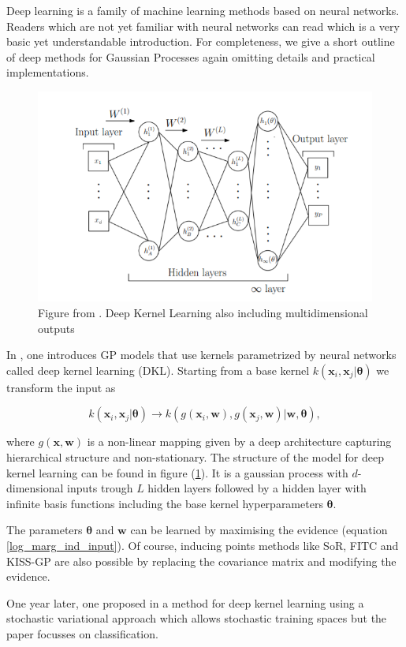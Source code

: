 \documentclass[12pt,a4paper,oneside]{book}
\begin{document}
Deep learning is a family of machine learning methods based on neural networks. Readers which are not yet familiar with neural networks can read \cite{nielsen2015neural} which is a very basic yet understandable introduction. For completeness, we give a short outline of deep methods for Gaussian Processes again omitting details and practical implementations. 


\begin{figure}[!htb]
     \centering
     \includegraphics[width=0.4\linewidth]{plot_deep_gpr}
     \caption{Figure from \cite{wilson2016deep}. Deep Kernel Learning also including multidimensional outputs}\label{fig:deep_gpr1.1}
\end{figure}

In \cite{wilson2016deep}, one introduces GP models that use kernels parametrized by neural networks called deep kernel learning (DKL). Starting from a base kernel $k(\bm{x}_i, \bm{x}_j | \bm{\theta})$ we transform the input as 

\begin{equation}
k(\bm{x}_i, \bm{x}_j | \bm{\theta}) \rightarrow k(g(\bm{x}_i, \bm{w}), g(\bm{x}_j, \bm{w})| \bm{w}, \bm{\theta}),
\end{equation}

where $g(\bm{x}, \bm{w})$ is a non-linear mapping given by a deep architecture capturing hierarchical structure and non-stationary. The structure of the model for deep kernel learning can be found in figure (\ref{fig:deep_gpr1.1}). It is a gaussian process with $d$-dimensional inputs trough $L$ hidden layers followed by a hidden layer with infinite basis functions including the base kernel hyperparameters $\bm{\theta}$. 


The parameters $\bm{\theta}$ and $\bm{w}$ can be learned by maximising the evidence (equation \ref{log_marg_ind_input}). Of course, inducing points methods like SoR, FITC and KISS-GP are also possible by replacing the covariance matrix and modifying the evidence. 

One year later, one proposed in \cite{wilson2016stochastic} a method for deep kernel learning using a stochastic variational approach which allows stochastic training spaces but the paper focusses on classification.
\end{document}
